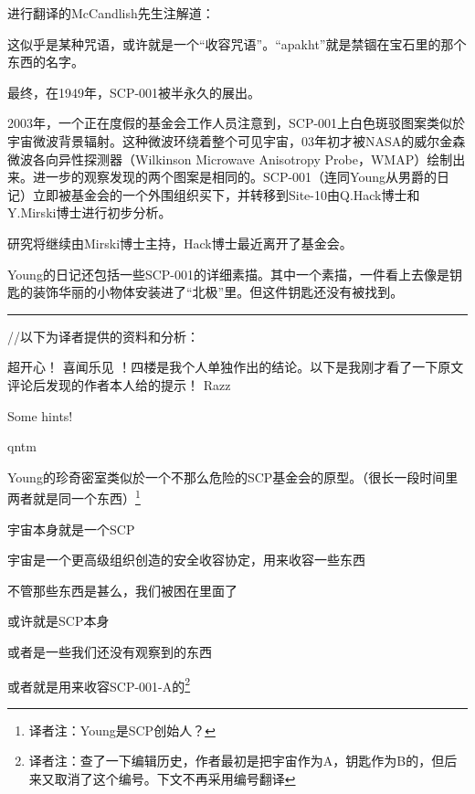 \documentclass[openany,a4paper]{book} %
\begin{document}
\vspace{12pt}

进行翻译的McCandlish先生注解道：
\begin{colorboxed}
这似乎是某种咒语，或许就是一个“收容咒语”。“apakht”就是禁锢在宝石里的那个东西的名字。
\end{colorboxed}

\vspace{12pt}

最终，在1949年，SCP-001被半永久的展出。\vspace{12pt}

2003年，一个正在度假的基金会工作人员注意到，SCP-001上白色斑驳图案类似於宇宙微波背景辐射。这种微波环绕着整个可见宇宙，03年初才被NASA的威尔金森微波各向异性探测器（Wilkinson Microwave Anisotropy Probe，WMAP）绘制出来。进一步的观察发现的两个图案是相同的。SCP-001（连同Young从男爵的日记）立即被基金会的一个外围组织买下，并转移到Site-10由Q.Hack博士和Y.Mirski博士进行初步分析。\vspace{12pt}

研究将继续由Mirski博士主持，Hack博士最近离开了基金会。\vspace{12pt}

Young的日记还包括一些SCP-001的详细素描。其中一个素描，一件看上去像是钥匙的装饰华丽的小物体安装进了“北极”里。但这件钥匙还没有被找到。\vspace{12pt}

\hrule\vspace{12pt}

//以下为译者提供的资料和分析：\vspace{12pt}

超开心！ 喜闻乐见 ！四楼是我个人单独作出的结论。以下是我刚才看了一下原文评论后发现的作者本人给的提示！ Razz\vspace{12pt}

Some hints!

qntm

Young的珍奇密室类似於一个不那么危险的SCP基金会的原型。（很长一段时间里两者就是同一个东西）\footnote{译者注：Young是SCP创始人？}

宇宙本身就是一个SCP

宇宙是一个更高级组织创造的安全收容协定，用来收容一些东西

不管那些东西是甚么，我们被困在里面了

或许就是SCP本身

或者是一些我们还没有观察到的东西

或者就是用来收容SCP-001-A的\footnote{译者注：查了一下编辑历史，作者最初是把宇宙作为A，钥匙作为B的，但后来又取消了这个编号。下文不再采用编号翻译}
\end{document}
